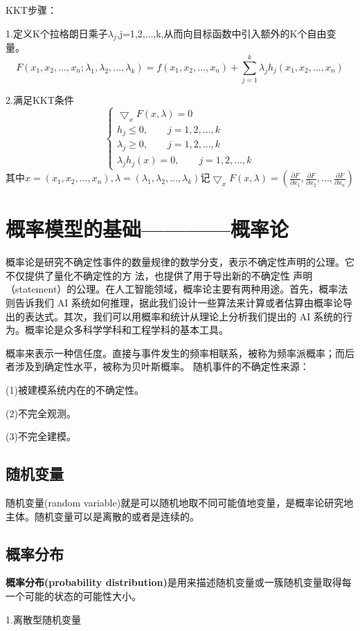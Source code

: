 \documentclass[openbib]{article}
\begin{document}
KKT步骤：

1.定义K个拉格朗日乘子$\lambda_j$,j=1,2,...,k,从而向目标函数中引入额外的K个自由变量。
$$F(x_1,x_2,...,x_n;\lambda_1,\lambda_2,...,\lambda_k)=f(x_1,x_2,...,x_n)+\sum_{j=1}^{k}\lambda_j h_j(x_1,x_2,...,x_n)$$

2.满足KKT条件
$$\left\{ \begin{array}{cl}
	\bigtriangledown _xF(x,\lambda)=0\\
	h_j \le0,\qquad j=1,2,...,k\\
	\lambda_j\ge0,\qquad j=1,2,...,k\\
	\lambda_jh_j(x)= 0,\qquad j=1,2,...,k
\end{array} \right.$$
其中$x=(x_1,x_2,...,x_n),\lambda=(\lambda_1,\lambda_2,...,\lambda_k)$记$\bigtriangledown_xF(x,\lambda)=(\frac{\partial F}{\partial x_1},\frac{\partial F}{\partial x_2},...,\frac{\partial F}{\partial x_n})$
\section{概率模型的基础————概率论}
概率论是研究不确定性事件的数量规律的数学分支，表示不确定性声明的公理。它不仅提供了量化不确定性的方
法，也提供了用于导出新的不确定性 声明（statement）的公理。在人工智能领域，概率论主要有两种用途。首先，概率法则告诉我们 AI 系统如何推理，据此我们设计一些算法来计算或者估算由概率论导出的表达式。其次，我们可以用概率和统计从理论上分析我们提出的 AI 系统的行为。概率论是众多科学学科和工程学科的基本工具。

概率来表示一种信任度。直接与事件发生的频率相联系，被称为频率派概率；而后者涉及到确定性水平，被称为贝叶斯概率。
随机事件的不确定性来源：

(1)被建模系统内在的不确定性。

(2)不完全观测。

(3)不完全建模。
\subsection{随机变量}
随机变量(random variable)就是可以随机地取不同可能值地变量，是概率论研究地主体。随机变量可以是离散的或者是连续的。
\subsection{概率分布}
\textbf{概率分布(probability distribution)}是用来描述随机变量或一簇随机变量取得每一个可能的状态的可能性大小。

\begin{center}
	1.离散型随机变量
\end{center}
\end{document}
